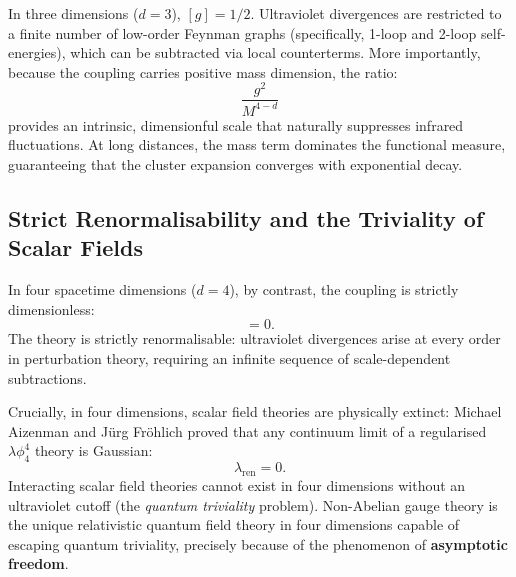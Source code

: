 In three dimensions ($d = 3$), $[g] = 1/2$. Ultraviolet divergences are restricted to a finite number of low-order Feynman graphs (specifically, 1-loop and 2-loop self-energies), which can be subtracted via local counterterms. More importantly, because the coupling carries positive mass dimension, the ratio:
\begin{equation}
\frac{g^2}{M^{4-d}}
\end{equation}
provides an intrinsic, dimensionful scale that naturally suppresses infrared fluctuations. At long distances, the mass term dominates the functional measure, guaranteeing that the cluster expansion converges with exponential decay.

\subsection{Strict Renormalisability and the Triviality of Scalar Fields}
\label{subsec:strict_renormalisability}
In four spacetime dimensions ($d = 4$), by contrast, the coupling is strictly dimensionless:
\begin{equation}
[g] = 0.
\end{equation}
The theory is strictly renormalisable: ultraviolet divergences arise at every order in perturbation theory, requiring an infinite sequence of scale-dependent subtractions.

Crucially, in four dimensions, scalar field theories are physically extinct: Michael Aizenman \cite{Aizenman1981} and J\"urg Fr\"ohlich \cite{FrohlichLieb1978} proved that any continuum limit of a regularised $\lambda \phi_4^4$ theory is Gaussian:
\begin{equation}
\lambda_{\mathrm{ren}} = 0.
\end{equation}
Interacting scalar field theories cannot exist in four dimensions without an ultraviolet cutoff (the \emph{quantum triviality} problem). Non-Abelian gauge theory is the unique relativistic quantum field theory in four dimensions capable of escaping quantum triviality, precisely because of the phenomenon of \textbf{asymptotic freedom}.

